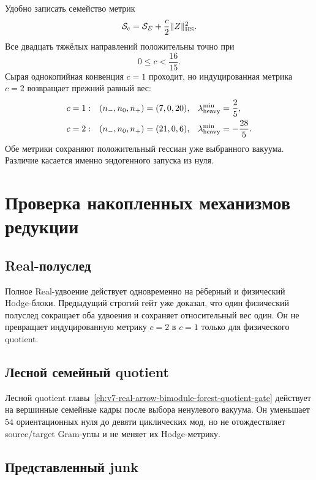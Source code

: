 Удобно записать семейство метрик
\begin{equation}
 \mathcal S_c=\mathcal S_E+\frac c2\|Z\|_{\rm HS}^2.
 \label{eq:v7-reduced-metric-scale-family}
\end{equation}
Все двадцать тяжёлых направлений положительны точно при
\begin{equation}
 0\le c<\frac{16}{15}.
 \label{eq:v7-reduced-metric-scale-window}
\end{equation}
Сырая однокопийная конвенция $c=1$ проходит, но индуцированная метрика
$c=2$ возвращает прежний равный вес:
\begin{align}
 c=1:&\quad (n_-,n_0,n_+)=(7,0,20),
 &\lambda_{\rm heavy}^{\min}&=\frac25,
 \label{eq:v7-reduced-raw-pass}\\
 c=2:&\quad (n_-,n_0,n_+)=(21,0,6),
 &\lambda_{\rm heavy}^{\min}&=-\frac{28}{5}.
 \label{eq:v7-reduced-inherited-fail}
\end{align}
Обе метрики сохраняют положительный гессиан уже выбранного вакуума. Различие
касается именно эндогенного запуска из нуля.

\section{Проверка накопленных механизмов редукции}

\subsection{Real-полуслед}

Полное Real-удвоение действует одновременно на рёберный и физический
Hodge-блоки. Предыдущий строгий гейт уже доказал, что один физический
полуслед сокращает оба удвоения и сохраняет относительный вес один. Он не
превращает индуцированную метрику $c=2$ в $c=1$ только для физического
quotient.

\subsection{Лесной семейный quotient}

Лесной quotient главы~\ref{ch:v7-real-arrow-bimodule-forest-quotient-gate}
действует на вершинные семейные кадры после выбора ненулевого вакуума. Он
уменьшает $54$ ориентационных нуля до девяти циклических мод, но не
отождествляет source/target Gram-углы и не меняет их Hodge-метрику.

\subsection{Представленный junk}

